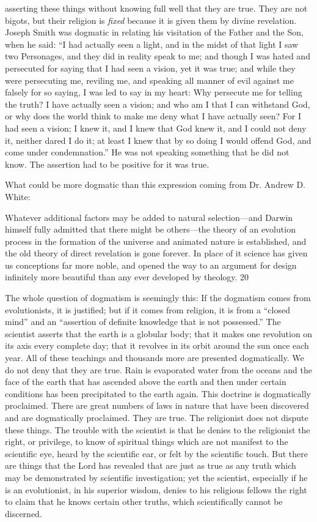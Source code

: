 asserting these things without knowing full well that they are true. They are not bigots, but
their religion is \textit{fixed} because it is given them by divine revelation. Joseph Smith was
dogmatic in relating his visitation of the Father and the Son, when he said: ``I had actually
seen a light, and in the midst of that light I saw two Personages, and they did in reality speak
to me; and though I was hated and persecuted for saying that I had seen a vision, yet it was
true; and while they were persecuting me, reviling me, and speaking all manner of evil
against me falsely for so saying, I was led to say in my heart: Why persecute me for telling
the truth? I have actually seen a vision; and who am I that I can withstand God, or why does
the world think to make me deny what I have actually seen? For I had seen a vision; I knew
it, and I knew that God knew it, and I could not deny it, neither dared I do it; at least I knew
that by so doing I would offend God, and come under condemnation.'' He was not speaking
something that he did not know. The assertion had to be positive for it was true.

What could be more dogmatic than this expression coming from Dr. Andrew D. White:

Whatever additional factors may be added to natural selection—and Darwin himself fully
admitted that there might be others—the theory of an evolution process in the formation of
the universe and animated nature is established, and the old theory of direct revelation is
gone forever. In place of it science has given us conceptions far more noble, and opened the
way to an argument for design infinitely more beautiful than any ever developed by theology.
20

The whole question of dogmatism is seemingly this: If the dogmatism comes from
evolutionists, it is justified; but if it comes from religion, it is from a ``closed mind'' and an
``assertion of definite knowledge that is not possessed.'' The scientist asserts that the earth is a
globular body; that it makes one revolution on its axis every complete day; that it revolves in
its orbit around the sun once each year. All of these teachings and thousands more are
presented dogmatically. We do not deny that they are true. Rain is evaporated water from the
oceans and the face of the earth that has ascended above the earth and then under certain
conditions has been precipitated to the earth again. This doctrine is dogmatically proclaimed.
There are great numbers of laws in nature that have been discovered and are dogmatically
proclaimed. They are true. The religionist does not dispute these things. The trouble with the
scientist is that he denies to the religionist the right, or privilege, to know of spiritual things
which are not manifest to the scientific eye, heard by the scientific ear, or felt by the
scientific touch. But there are things that the Lord has revealed that are just as true as any
truth which may be demonstrated by scientific investigation; yet the scientist, especially if he
is an evolutionist, in his superior wisdom, denies to his religious fellows the right to claim
that he knows certain other truths, which scientifically cannot be discerned.

